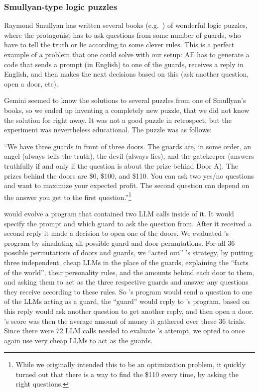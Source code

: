  \subsubsection{Smullyan-type logic puzzles}
\href{https://google-deepmind.github.io/alphaevolve_repository_of_problems/problems/67.html}{\faLink}

Raymond Smullyan has written several books (e.g.~\cite{smullyan1986name}) of wonderful logic puzzles, where the protagonist has to ask questions from some number of guards, who have to tell the truth or lie according to some clever rules. This is a perfect example of a problem that one could solve with our setup: AE has to generate a code that sends a prompt (in English) to one of the guards, receives a reply in English, and then makes the next decisions based on this (ask another question, open a door, etc).



Gemini seemed to know the solutions to several puzzles from one of Smullyan's books, so we ended up inventing a completely new puzzle, that we did not know the solution for right away. It was not a good puzzle in retrospect, but the experiment was nevertheless educational. The puzzle was as follows:

``We have three guards in front of three doors. The guards are, in some order, an angel (always tells the truth), the devil (always lies), and the gatekeeper (answers truthfully if and only if the question is about the prize behind Door A). The prizes behind the doors are \$0, \$100, and \$110. You can ask two yes/no questions and want to maximize your expected profit. The second question can depend on the answer you get to the first question.''\footnote{While we originally intended this to be an optimization problem, it quickly turned out that there is a way to find the \$110 every time, by asking the right questions.}

\AlphaEvolve would evolve a program that contained two LLM calls inside of it. It would specify the prompt and which guard to ask the question from. After it received a second reply it made a decision to open one of the doors. We evaluated \AlphaEvolve's program by simulating all possible guard and door permutations. For all 36 possible permutations of doors and guards, we ``acted out'' \AlphaEvolve's strategy, by putting three independent, cheap LLMs in the place of the guards, explaining the ``facts of the world'', their personality rules, and the amounts behind each door to them, and asking them to act as the three respective guards and answer any questions they receive according to these rules. So \AlphaEvolve's program would send a question to one of the LLMs acting as a guard, the ``guard'' would reply to \AlphaEvolve's program, based on this reply \AlphaEvolve would ask another question to get another reply, and then open a door. \AlphaEvolve's score was then the average amount of money it gathered over these 36 trials. Since there were 72 LLM calls needed to evaluate \AlphaEvolve's attempt, we opted to once again use very cheap LLMs to act as the guards.

